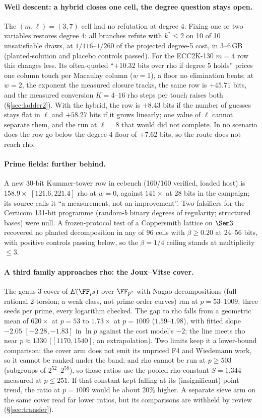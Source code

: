 \paragraph{Weil descent: a hybrid closes one cell, the degree question
stays open.} The $(m,\ell)=(3,7)$ cell had no refutation at degree 4. Fixing
one or two variables restores degree 4: all branches refute with $k^*\le2$ on
10 of 10 unsatisfiable draws, at $1/116$--$1/260$ of the projected degree-5
cost, in 3--6\,GB (planted-solution and placebo controls passed). For the
ECC2K-130 $m=4$ row this changes less. Its often-quoted ``$+10.32$ bits over
rho if degree 5 holds'' prices one column touch per Macaulay column ($w=1$),
a floor no elimination beats; at $w=2$, the exponent the measured closure
tracks, the same row is $+45.71$ bits, and the measured conversion
$K=4$--$16$ rho steps per touch raises both (\S\ref{sec:ladder2}). With the
hybrid, the row is $+8.43$ bits if the number of guesses stays flat in $\ell$
and $+58.27$ bits if it grows linearly; one value of $\ell$ cannot separate
them, and the run at $\ell=8$ that would did not complete. In no scenario does
the row go below the degree-4 floor of $+7.62$ bits, so the route does not
reach rho.

\paragraph{Prime fields: further behind.} A new 30-bit Kummer-tower row in
ecbench (160/160 verified, loaded host) is $158.9\times$ $[121.6,221.4]$ rho at
$w=0$, against $141\times$ at 28 bits in the campaign; its source calls it ``a
measurement, not an improvement''. Two falsifiers for the Certicom 131-bit
programme (random-$b$ binary degrees of regularity; structured bases) were
null. A frozen-protocol test of a Coppersmith lattice on $\Sem3$ recovered no
planted decomposition in any of 96 cells with $\beta\ge0.20$ at 24--56 bits,
with positive controls passing below, so the $\beta=1/4$ ceiling stands at
multiplicity $\le3$.

\paragraph{A third family approaches rho: the Joux--Vitse cover.} The
genus-3 cover of $E(\FF_{p^6})$ over $\FF_{p^2}$ with Nagao decompositions
(full rational 2-torsion; a weak class, not prime-order curves) ran at
$p=53$--$1009$, three seeds per prime, every logarithm checked. The gap to
rho falls from a geometric mean of $620\times$ at $p=53$ to $1.73\times$ at
$p=1009$ ($1.59$--$1.98$), with fitted slope $-2.05$ $[-2.28,-1.83]$ in $\ln p$
against the cost model's $-2$; the line meets rho near $p\approx1330$
($[1170,1540]$, an extrapolation). Two limits keep it a lower-bound comparison:
the cover arm does not emit its unpriced F4 and Wiedemann work, so it cannot be
ranked under the band; and rho cannot be run at $p\ge503$ (subgroups of
$2^{52}$--$2^{58}$), so those ratios use the pooled rho constant $S=1.344$
measured at $p\le251$. If that constant kept falling at its (insignificant)
point trend, the ratio at $p=1009$ would be about 20\% higher. A separate sieve arm on the same cover read far lower ratios, but its
comparisons are withheld by review (\S\ref{sec:transfer}).

